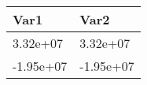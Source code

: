 \begin{tabular}{ll}
\hline 
Var1 & Var2 \\ 
\hline 
3.32e+07 & 3.32e+07 \\ 
-1.95e+07 & -1.95e+07 \\ 
\hline 
\end{tabular}